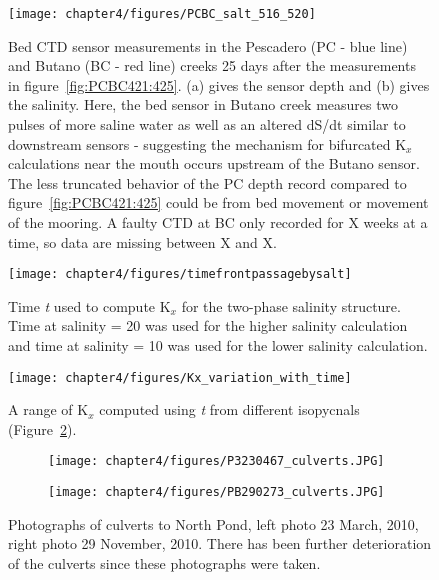 \begin{figure}
	\texttt{[image: chapter4/figures/PCBC\_salt\_516\_520]}
	\caption{Bed CTD sensor measurements in the Pescadero (PC - blue line) and Butano (BC - red line) creeks 25 days after the measurements in figure~\ref{fig:PCBC421:425}. (a) gives the sensor depth and (b) gives the salinity. Here, the bed sensor in Butano creek measures two pulses of more saline water as well as an altered dS/dt similar to downstream sensors - suggesting the mechanism for bifurcated K$_x$ calculations near the mouth occurs upstream of the Butano sensor. The less truncated behavior of the PC depth record compared to figure~\ref{fig:PCBC421:425} could be from bed movement or movement of the mooring. A faulty CTD at BC only recorded for X weeks at a time, so data are missing between X and X.}  \label{fig:PCBC511:516}
\end{figure}


\begin{figure}
\centering
	\texttt{[image: chapter4/figures/timefrontpassagebysalt]}
	\caption{Time \emph{t} used to compute K$_x$ for the two-phase salinity structure. Time at salinity = 20 was used for the higher salinity calculation and time at salinity = 10 was used for the lower salinity calculation.}  \label{fig:tvsS}
\end{figure}



\begin{figure}
\centering
	\texttt{[image: chapter4/figures/Kx\_variation\_with\_time]}
	\caption{A range of K$_x$ computed using \emph{t} from different isopycnals (Figure~\ref{fig:tvsS}).}  \label{fig:Kxvst}
\end{figure}



\begin{figure}
\centering
\begin{subfigure}{.48\textwidth}
	\texttt{[image: chapter4/figures/P3230467\_culverts.JPG]}
\end{subfigure}
\begin{subfigure}{.48\textwidth}
	\texttt{[image: chapter4/figures/PB290273\_culverts.JPG]}
\end{subfigure}
\caption{Photographs of culverts to North Pond, left photo 23 March, 2010, right photo 29 November, 2010. There has been further deterioration of the culverts since these photographs were taken.} \label{fig:photoCulverts}
\end{figure}



